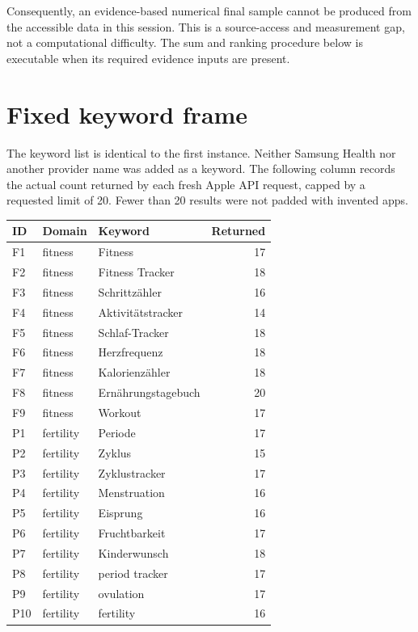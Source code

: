 \documentclass[10pt,a4paper]{article}
\begin{document}
Consequently, an evidence-based numerical final sample cannot be produced from
the accessible data in this session. This is a source-access and measurement gap,
not a computational difficulty. The sum and ranking procedure below is executable
when its required evidence inputs are present.

\section{Fixed keyword frame}
The keyword list is identical to the first instance. Neither Samsung Health nor
another provider name was added as a keyword. The following column records the
actual count returned by each fresh Apple API request, capped by a requested
limit of 20. Fewer than 20 results were not padded with invented apps.

\begin{longtable}{L{10mm}L{22mm}L{95mm}r}
\toprule ID & Domain & Keyword & Returned\\\midrule\endhead
F1 & fitness & Fitness & 17 \\
F2 & fitness & Fitness Tracker & 18 \\
F3 & fitness & Schrittzähler & 16 \\
F4 & fitness & Aktivitätstracker & 14 \\
F5 & fitness & Schlaf-Tracker & 18 \\
F6 & fitness & Herzfrequenz & 18 \\
F7 & fitness & Kalorienzähler & 18 \\
F8 & fitness & Ernährungstagebuch & 20 \\
F9 & fitness & Workout & 17 \\
P1 & fertility & Periode & 17 \\
P2 & fertility & Zyklus & 15 \\
P3 & fertility & Zyklustracker & 17 \\
P4 & fertility & Menstruation & 16 \\
P5 & fertility & Eisprung & 16 \\
P6 & fertility & Fruchtbarkeit & 17 \\
P7 & fertility & Kinderwunsch & 18 \\
P8 & fertility & period tracker & 17 \\
P9 & fertility & ovulation & 17 \\
P10 & fertility & fertility & 16 \\
\bottomrule\end{longtable}
\end{document}
